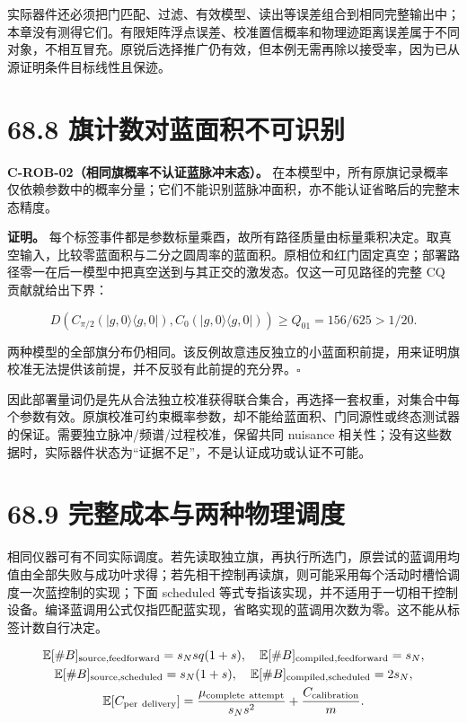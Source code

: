 \documentclass[
  11pt,
  oneside]{book}
\begin{document}
实际器件还必须把门匹配、过滤、有效模型、读出等误差组合到相同完整输出中；本章没有测得它们。有限矩阵浮点误差、校准置信概率和物理迹距离误差属于不同对象，不相互冒充。原锐后选择推广仍有效，但本例无需再除以接受率，因为已从源证明条件目标线性且保迹。

\section{68.8 旗计数对蓝面积不可识别}

\protect\hypertarget{c-rob-02}{}{}

\textbf{C-ROB-02（相同旗概率不认证蓝脉冲末态）。}
在本模型中，所有原旗记录概率仅依赖参数中的概率分量；它们不能识别蓝脉冲面积，亦不能认证省略后的完整末态精度。

\textbf{证明。}
每个标签事件都是参数标量乘酉，故所有路径质量由标量乘积决定。取真空输入，比较零蓝面积与二分之圆周率的蓝面积。原相位和红门固定真空；部署路径零一在后一模型中把真空送到与其正交的激发态。仅这一可见路径的完整
CQ 贡献就给出下界：

\[
D(C_{\pi/2}(|g,0\rangle\langle g,0|),C_0(|g,0\rangle\langle g,0|))
\ge Q_{01}=156/625>1/20.
\]

两种模型的全部旗分布仍相同。该反例故意违反独立的小蓝面积前提，用来证明旗校准无法提供该前提，并不反驳有此前提的充分界。\(\square\)

因此部署量词仍是先从合法独立校准获得联合集合，再选择一套权重，对集合中每个参数有效。原旗校准可约束概率参数，却不能给蓝面积、门同源性或终态测试器的保证。需要独立脉冲/频谱/过程校准，保留共同
nuisance
相关性；没有这些数据时，实际器件状态为``证据不足''，不是认证成功或认证不可能。

\section{68.9 完整成本与两种物理调度}

相同仪器可有不同实际调度。若先读取独立旗，再执行所选门，原尝试的蓝调用均值由全部失败与成功叶求得；若先相干控制再读旗，则可能采用每个活动时槽恰调度一次蓝控制的实现；下面
scheduled
等式专指该实现，并不适用于一切相干控制设备。编译蓝调用公式仅指匹配蓝实现，省略实现的蓝调用次数为零。这不能从标签计数自行决定。

\[
\begin{gathered}
\mathbb E[\#B]_{\rm source,feedforward}=s_Nsq(1+s),\quad
\mathbb E[\#B]_{\rm compiled,feedforward}=s_N,\\
\mathbb E[\#B]_{\rm source,scheduled}=s_N(1+s),\quad
\mathbb E[\#B]_{\rm compiled,scheduled}=2s_N,\\
\mathbb E[C_{\rm per\ delivery}]
=\frac{\mu_{\rm complete\ attempt}}{s_Ns^2}
+\frac{C_{\rm calibration}}{m}.
\end{gathered}
\]
\end{document}
